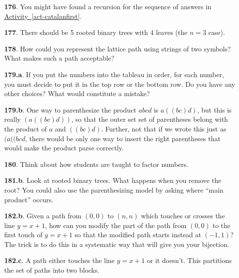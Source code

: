 \documentclass[10pt,]{book}
\theoremstyle{plain}
\theoremstyle{definition}
\theoremstyle{definition}
\theoremstyle{definition}
\numberwithin{equation}{chapter}
\begin{document}
\begin{itemize}[itemsep=1em]
\item[\textbf{176}.]\hypertarget{p-1001}{}%
You might have found a recursion for the sequence of answers in \hyperref[act-catalanfirst]{Activity~\ref{act-catalanfirst}}.%

\item[\textbf{177}.]\hypertarget{p-1004}{}%
There should be 5 rooted binary trees with 4 leaves (the \(n = 3\) case).%

\item[\textbf{178}.]\hypertarget{p-1009}{}%
How could you represent the lattice path using strings of two symbols?  What makes such a path acceptable?%

\item[\textbf{179.a}.]\hypertarget{p-1013}{}%
If you put the numbers into the tableau in order, for each number, you must decide to put it in the top row or the bottom row.  Do you have any other choices?  What would constitute a mistake?%

\item[\textbf{179.b}.]\hypertarget{p-1015}{}%
One way to parenthesize the product \(abcd\) is \(a((bc)d)\), but this is really \((a((bc)d))\), so that the outer set set of parentheses belong with the product of \(a\) and \(((bc)d)\).  Further, not that if we wrote this just as \((a((bcd\), there would be only one way to insert the right parentheses that would make the product parse correctly.%

\item[\textbf{180}.]\hypertarget{p-1018}{}%
Think about how students are taught to factor numbers.%

\item[\textbf{181.b}.]\hypertarget{p-1023}{}%
Look at rooted binary trees.  What happens when you remove the root?  You could also use the parenthesizing model by asking where ``main product'' occurs.%

\item[\textbf{182.b}.]\hypertarget{p-1030}{}%
Given a path from \((0, 0)\) to \((n, n)\) which touches or crosses the line \(y = x + 1\), how can you modify the part of the path from \((0, 0)\) to the first touch of \(y = x + 1\) so that the modified path starts instead at \((-1, 1)\)? The trick is to do this in a systematic way that will give you your bijection.%

\item[\textbf{182.c}.]\hypertarget{p-1033}{}%
A path either touches the line \(y = x + 1\) or it doesn't. This partitions the set of paths into two blocks.%


\end{itemize}
\end{document}
